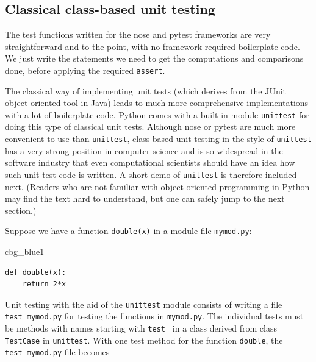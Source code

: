 \documentclass[%
oneside,                 %
final,                   %
10pt]{article}
\newenvironment{_cod_tight}[1]{
   \def\FrameCommand{\colorbox{#1}}
   \FrameRule0.6pt\MakeFramed {\FrameRestore}\vskip3mm}
   {\vskip0mm\endMakeFramed}
\newenvironment{cod}[1]{
\bgroup\rmfamily
\fboxsep=0mm\relax
\begin{_cod_tight}{#1}
\list{}{\parsep=-2mm\parskip=0mm\topsep=0pt\leftmargin=2mm
\rightmargin=2\leftmargin\leftmargin=4pt\relax}
\item\relax}
{\endlist\end{_cod_tight}\egroup}
\begin{document}
\subsection{Classical class-based unit testing}
\label{softeng1:basic:unittest}


The test functions written for the nose and pytest frameworks are
very straightforward and to the point, with no framework-required boilerplate
code. We just write the statements we need to get the computations and
comparisons done, before applying the required \texttt{assert}.

The classical way of implementing unit tests (which derives from the
JUnit object-oriented tool in Java) leads to much more comprehensive
implementations with a lot of boilerplate code.  Python comes with a
built-in module \texttt{unittest} for doing this type of classical unit
tests. Although nose or pytest are much more convenient to use than
\texttt{unittest}, class-based unit testing in the style of \texttt{unittest} has a
very strong position in computer science and is so widespread in
the software industry that
even computational scientists should have an idea how such unit test
code is written. A short demo of \texttt{unittest} is therefore included
next. (Readers who are not familiar with object-oriented programming
in Python may find the text hard to understand, but one can safely
jump to the next section.)

 

Suppose we have a function \texttt{double(x)} in a module file \texttt{mymod.py}:

\begin{cod}{cbg_blue1}\begin{Verbatim}[numbers=none,fontsize=\fontsize{9pt}{9pt},baselinestretch=0.95,xleftmargin=2mm]
def double(x):
    return 2*x
\end{Verbatim}
\end{cod}
\noindent
Unit testing with the aid of the \texttt{unittest} module
consists of writing a file \Verb!test_mymod.py! for testing the functions
in \texttt{mymod.py}. The individual tests must be methods with names
starting with \Verb!test_! in a class derived from class \texttt{TestCase} in
\texttt{unittest}. With one test method for the function \texttt{double}, the
\Verb!test_mymod.py! file becomes
\end{document}
